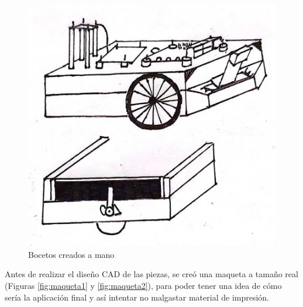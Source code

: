 \begin{figure}[ht!]
\begin{minipage}{0.4\linewidth}
	\end{minipage}
	\hspace{2cm}
	\begin{minipage}{0.5\linewidth}
		\centering
		\includegraphics[width=\linewidth]{figs/cap5/boceto_papel.jpeg}
	\end{minipage}
	\caption{Bocetos creados a mano}
	\label{fig:bocetos}
\end{figure}

Antes de realizar el diseño \acs{CAD} de las piezas, se creó una maqueta a tamaño real (Figuras \ref{fig:maqueta1} y \ref{fig:maqueta2}), para poder tener una idea de cómo sería la aplicación final y así intentar no malgastar material de impresión. 

